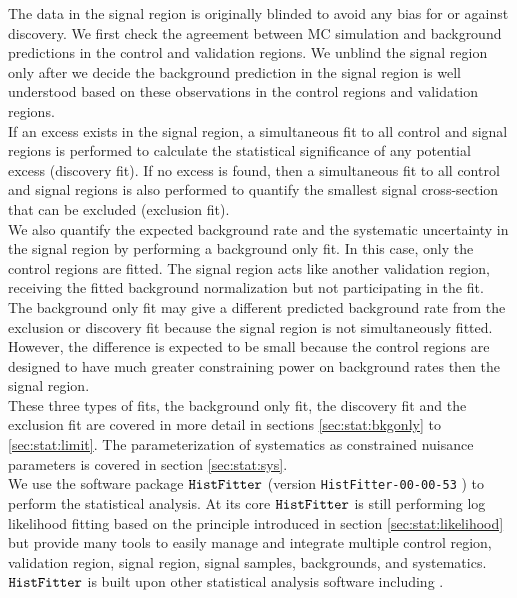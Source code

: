 \indent The data in the signal region is originally blinded to avoid any bias for or against discovery.  We first check the agreement between MC simulation and background predictions in the control and validation regions.  We unblind the signal region only after we decide the background prediction in the signal region is well understood based on these observations in the control regions and validation regions. \\

\indent If an excess exists in the signal region, a simultaneous fit to all control and signal regions is performed to calculate the statistical significance of any potential excess (discovery fit).   If no excess is found, then a simultaneous fit to all control and signal regions is also performed to quantify the smallest signal cross-section that can be excluded (exclusion fit).  \\

\indent We also quantify the expected background rate and the systematic uncertainty in the signal region by performing a background only fit.  In this case, only the control regions are fitted. The signal region acts like another validation region, receiving the fitted background normalization but not participating in the fit.  The background only fit may give a different predicted background rate from the exclusion or discovery fit because the signal region is not simultaneously fitted.  However, the difference is expected to be small because the control regions are designed to have much greater constraining power on background rates then the signal region.  \\

\indent These three types of fits, the background only fit, the discovery fit and the exclusion fit are covered in more detail in sections \ref{sec:stat:bkgonly} to \ref{sec:stat:limit}. The parameterization of systematics as constrained nuisance parameters is covered in section \ref{sec:stat:sys}. \\

\indent We use the software package ${\tt HistFitter}$ (version {\tt HistFitter-00-00-53} ) to perform the statistical analysis.\cite{HistFitter}  At its core ${\tt HistFitter}$ is still performing log likelihood fitting based on the principle introduced in section \ref{sec:stat:likelihood} but \HistFitter provide many tools to easily manage and integrate multiple control region, validation region, signal region, signal samples, backgrounds, and systematics.  ${\tt HistFitter}$ is built upon other statistical analysis software including \RooFit.\cite{RooFit}

